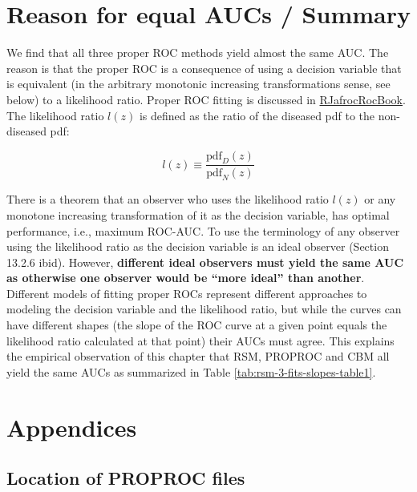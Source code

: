 \documentclass[
]{book}
\begin{document}
\hypertarget{rsm-3-fits-discussion-summary}{%
\section{Reason for equal AUCs / Summary}\label{rsm-3-fits-discussion-summary}}

We find that all three proper ROC methods yield almost the same AUC. The reason is that the proper ROC is a consequence of using a decision variable that is equivalent (in the arbitrary monotonic increasing transformations sense, see below) to a likelihood ratio. Proper ROC fitting is discussed in \href{https://dpc10ster.github.io/RJafrocRocBook/proper-roc-models.html\#proper-roc-models-likelihood-ratio-theorem1}{RJafrocRocBook}. The likelihood ratio \(l(z)\) is defined as the ratio of the diseased pdf to the non-diseased pdf:

\begin{equation}    
l(z) \equiv \frac{\text{pdf}_D(z)}{\text{pdf}_N(z)}
\label{eq:rsm-3-fits-l-z}
\end{equation}

There is a theorem \citep{barrett2013foundations} that an observer who uses the likelihood ratio \(l(z)\) or any monotone increasing transformation of it as the decision variable, has optimal performance, i.e., maximum ROC-AUC. To use the terminology of \citep{barrett2013foundations} any observer using the likelihood ratio as the decision variable is an ideal observer (Section 13.2.6 ibid). However, \textbf{different ideal observers must yield the same AUC as otherwise one observer would be ``more ideal'' than another}. Different models of fitting proper ROCs represent different approaches to modeling the decision variable and the likelihood ratio, but while the curves can have different shapes (the slope of the ROC curve at a given point equals the likelihood ratio calculated at that point) their AUCs must agree. This explains the empirical observation of this chapter that RSM, PROPROC and CBM all yield the same AUCs as summarized in Table \ref{tab:rsm-3-fits-slopes-table1}.

\hypertarget{rsm-3-fits-appendices}{%
\section{Appendices}\label{rsm-3-fits-appendices}}

\hypertarget{rsm-3-fits-one-dataset-proproc}{%
\subsection{Location of PROPROC files}\label{rsm-3-fits-one-dataset-proproc}}
\end{document}
